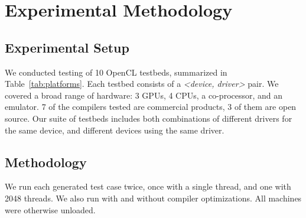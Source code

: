 \section{Experimental Methodology}

\subsection{Experimental Setup}

\begin{table*}[t!]
  \scriptsize %
  \centering %
  
  \caption{%
    OpenCL testbeds, the time spent in automated testing, and the number of bug reports submitted to date. %
  }
  \label{tab:platforms}
\end{table*}

We conducted testing of 10 OpenCL testbeds, summarized in Table~\ref{tab:platforms}. Each testbed consists of a \emph{<device, driver>} pair. We covered a broad range of hardware: 3 GPUs, 4 CPUs, a co-processor, and an emulator. 7 of the compilers tested are commercial products, 3 of them are open source. Our suite of testbeds includes both combinations of different drivers for the same device, and different devices using the same driver.

\subsection{Methodology}

We run each generated test case twice, once with a single thread, and one with 2048 threads. We also run with and without compiler optimizations. All machines were otherwise unloaded.
